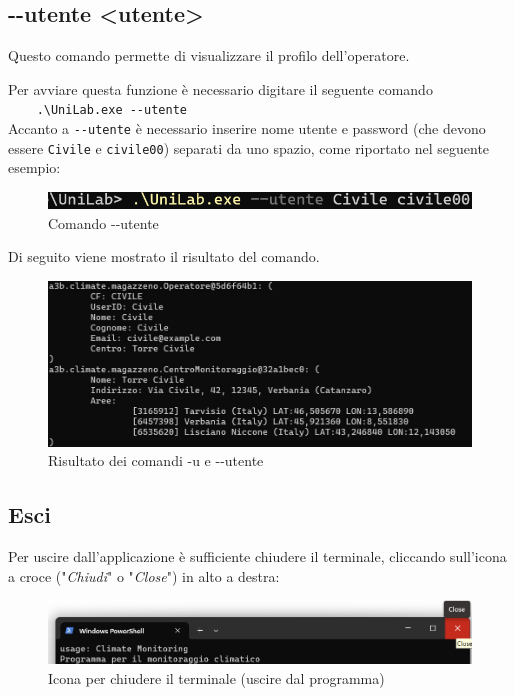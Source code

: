 \documentclass[12pt]{scrreprt}
\begin{document}
		\subsection{-$ $-utente <utente>}
		Questo comando permette di visualizzare il profilo dell'operatore.
		
		Per avviare questa funzione \`e necessario digitare il seguente comando
		\\\verb!    .\UniLab.exe --utente!\\
		Accanto a \verb!--utente! \`e necessario inserire nome utente e password (che devono essere \verb!Civile! e \verb!civile00!) separati da uno spazio, come riportato nel seguente esempio:
		\begin{figure}[H]
			\centering
			\includegraphics[width=0.6\linewidth]{Screen/utentecom}
			\caption{Comando -$ $-utente}
			\label{fig:utentecom}
		\end{figure}
		
		Di seguito viene mostrato il risultato del comando.
		
		\begin{figure}[H]
			\centering
			\includegraphics[width=0.9\linewidth]{Screen/utente}
			\caption{Risultato dei comandi -u e -$ $-utente}
			\label{fig:utente}
		\end{figure}
		
	\pagebreak
	\subsection{Esci}
	Per uscire dall’applicazione \`e sufficiente chiudere il terminale, cliccando sull’icona a croce ("\textsl{Chiudi}" o "\textsl{Close}") in alto a destra:
	\begin{figure}[H]
		\centering
		\includegraphics[width=0.9\linewidth]{Screen/esci}
		\caption{Icona per chiudere il terminale (uscire dal programma)}
		\label{fig:esci}
	\end{figure}
\end{document}
